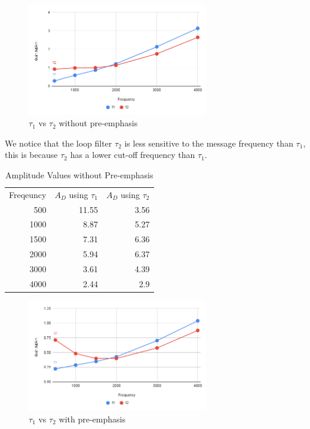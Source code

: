 \documentclass[12pt]{article}
\begin{document}
\begin{figure}[H]
    \centering
    \includegraphics[width=0.7\textwidth]{assets/chart_1.png}
    \caption{$\tau_1$ vs $\tau_2$ without pre-emphasis}
\end{figure}
We notice that the loop filter $\tau_2$ is less sensitive to the message frequency than $\tau_1$, this is because $\tau_2$ has a lower cut-off frequency than $\tau_1$.
\begin{table}[H]
    \centering
    \begin{tabular}{|r|r|r|}
    \cline{1-3}
    \multicolumn{1}{|l|}{Freqeuncy} & \multicolumn{1}{l|}{$A_D$ using $\tau_1$} & \multicolumn{1}{l|}{$A_D$ using $\tau_2$} \\
    \cline{1-3}
    500  & 11.55 & 3.56 \\
    1000 & 8.87  & 5.27 \\
    1500 & 7.31  & 6.36 \\
    2000 & 5.94  & 6.37 \\
    3000 & 3.61  & 4.39 \\
    4000 & 2.44  & 2.9  \\
    \cline{1-3}
    \end{tabular}
    \caption{Amplitude Values without Pre-emphasis}
\end{table}
\begin{figure}[H]
    \centering
    \includegraphics[width=0.7\textwidth]{assets/chart_2.png}
    \caption{$\tau_1$ vs $\tau_2$ with pre-emphasis}
\end{figure}
\end{document}

